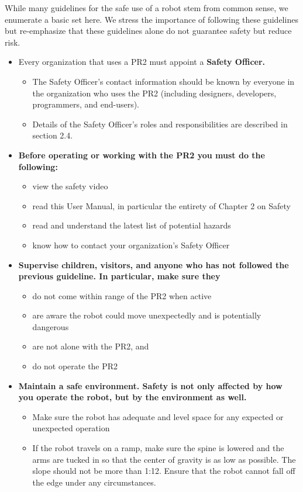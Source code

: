 While many guidelines for the safe use of a robot stem from common sense, we enumerate a basic set here.  We stress the importance of following these guidelines but re-emphasize that these guidelines alone do not guarantee safety but reduce risk.
\begin{itemize}
\item Every organization that uses a PR2 must appoint a \bf{Safety Officer}.
\begin{itemize}
\item The Safety Officer's contact information should be known by everyone in the organization who uses the PR2 (including designers, developers, programmers, and end-users).
\item Details of the Safety Officer's roles and responsibilities are described in section 2.4.
\end{itemize}
\item \bf{Before operating} or working with the PR2 you must do the following:
\begin{itemize}
\item view the safety video
\item read this User Manual, in particular the entirety of Chapter 2 on Safety
\item read and understand the latest list of potential hazards
\item know how to contact your organization's Safety Officer
\end{itemize}
\item \bf{Supervise children, visitors}, and anyone who has not followed the previous guideline.  In particular, make sure they
\begin{itemize}
\item do not come within range of the PR2 when active
\item are aware the robot could move unexpectedly and is potentially dangerous
\item are not alone with the PR2, and
\item do not operate the PR2
\end{itemize}
\item \bf{Maintain a safe environment}.  Safety is not only affected by how you operate the robot, but by the environment as well.
\begin{itemize}
\item Make sure the robot has adequate and level space for any expected or unexpected operation
\item If the robot travels on a ramp, make sure the spine is lowered and the arms are tucked in so that the center of gravity is as low as possible. The slope should not be more than 1:12. Ensure that the robot cannot fall off the edge under any circumstances.

\end{itemize}
\end{itemize}
